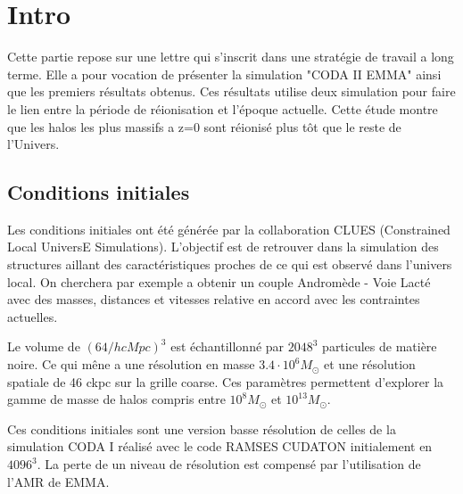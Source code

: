 \label{sec:CODAEMMA}

\section{Intro}


Cette partie repose sur une lettre qui s'inscrit dans une stratégie de travail a long terme.
Elle a pour vocation de présenter la simulation "CODA II EMMA" ainsi que les premiers résultats obtenus.
Ces résultats utilise deux simulation pour faire le lien entre la période de réionisation et l’époque actuelle.
Cette étude montre que les halos les plus massifs a z=0 sont réionisé plus tôt que le reste de l'Univers.



\subsection{Conditions initiales}

Les conditions initiales ont été générée par la collaboration CLUES (Constrained Local UniversE Simulations).
L'objectif est de retrouver dans la simulation des structures aillant des caractéristiques proches de ce qui est observé dans l'univers local.
On cherchera par exemple a obtenir un couple Andromède - Voie Lacté avec des masses, distances et vitesses relative en accord avec les contraintes actuelles.


Le volume de $\left( 64/h cMpc \right) ^3$ est échantillonné par $2048^3$ particules de matière noire.
Ce qui mêne a une résolution en masse $3.4 \cdot 10^6 M_\odot$ et une résolution spatiale de 46 ckpc sur la grille coarse.
Ces paramètres permettent d'explorer la gamme de masse de halos compris entre $10^8 M_\odot$ et  $10^{13}M_\odot$.

Ces conditions initiales sont une version basse résolution de celles de la simulation CODA I%
réalisé avec le code RAMSES CUDATON %
initialement en $4096^3$.
La perte de un niveau de résolution est compensé par l'utilisation de l'AMR de EMMA.

